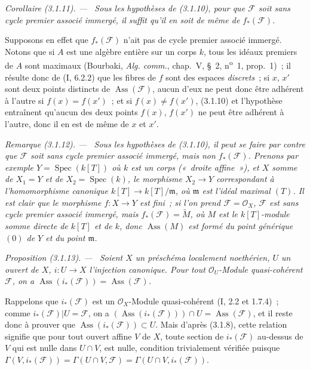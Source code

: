 \documentclass[10pt,oneside]{book}
\newenvironment{proposition}[1][]{%
  \par\medskip\noindent\itshape Proposition (#1). ---\ }{\par}
\newenvironment{corollary}[1][]{%
  \par\medskip\noindent\itshape Corollaire (#1). ---\ }{\par}
\newenvironment{remark}[1][]{%
  \par\medskip\noindent\itshape Remarque (#1). ---\ }{\par}
\begin{document}
\begin{corollary}[3.1.11]
\label{IV.2.3.1.11-fr}
Sous les hypothèses de (3.1.10), pour que $\mathcal F$ soit sans cycle premier
associé immergé, il suffit qu'il en soit de même de $f_*(\mathcal F)$.
\end{corollary}

Supposons en effet que $f_*(\mathcal F)$ n'ait pas de cycle premier associé
immergé. Notons que si $A$ est une algèbre entière sur un corps $k$, tous les
idéaux premiers de $A$ sont maximaux (Bourbaki, \emph{Alg. comm.}, chap.~V,
\S~2, n\textsuperscript{o}~1, prop.~1)~; il résulte donc de (I, 6.2.2) que les
fibres de $f$ sont des espaces \emph{discrets}~; si $x$, $x'$ sont deux points
distincts de $\operatorname{Ass}(\mathcal F)$, aucun d'eux ne peut donc être
adhérent à l'autre si $f(x)=f(x')$~; et si $f(x)\ne f(x')$, (3.1.10) et
l'hypothèse entraînent qu'aucun des deux points $f(x)$, $f(x')$ ne peut être
adhérent à l'autre, donc il en est de même de $x$ et $x'$.

\begin{remark}[3.1.12]
\label{IV.2.3.1.12-fr}
Sous les hypothèses de (3.1.10), il peut se faire par contre que $\mathcal F$
soit sans cycle premier associé immergé, mais non $f_*(\mathcal F)$. Prenons
par exemple $Y=\operatorname{Spec}(k[T])$ où $k$ est un corps («~droite
affine~»), et $X$ somme de $X_1=Y$ et de $X_2=\operatorname{Spec}(k)$, le
morphisme $X_2\to Y$ correspondant à l'homomorphisme canonique
$k[T]\to k[T]/\mathfrak m$, où $\mathfrak m$ est l'idéal maximal $(T)$. Il
est clair que le morphisme $f:X\to Y$ est fini~; si l'on prend
$\mathcal F=\mathcal O_X$, $\mathcal F$ est sans cycle premier associé
immergé, mais $f_*(\mathcal F)=\widetilde M$, où $M$ est le $k[T]$-module
somme directe de $k[T]$ et de $k$, donc $\operatorname{Ass}(M)$ est formé du
point générique $(0)$ de $Y$ et du point $\mathfrak m$.
\end{remark}

\begin{proposition}[3.1.13]
\label{IV.2.3.1.13-fr}
Soient $X$ un préschéma localement noethérien, $U$ un ouvert de $X$,
$i:U\to X$ l'injection canonique. Pour tout $\mathcal O_U$-Module
quasi-cohérent $\mathcal F$, on a
$\operatorname{Ass}(i_*(\mathcal F))=\operatorname{Ass}(\mathcal F)$.
\end{proposition}

Rappelons que $i_*(\mathcal F)$ est un $\mathcal O_X$-Module quasi-cohérent
(I, 2.2 et 1.7.4)~; comme $i_*(\mathcal F)|U=\mathcal F$, on a
$(\operatorname{Ass}(i_*(\mathcal F)))\cap U=\operatorname{Ass}(\mathcal F)$,
et il reste donc à prouver que $\operatorname{Ass}(i_*(\mathcal F))\subset U$.
Mais d'après (3.1.8), cette relation signifie que pour tout ouvert affine $V$
de $X$, toute section de $i_*(\mathcal F)$ au-dessus de $V$ qui est nulle
dans $U\cap V$, est nulle, condition trivialement vérifiée puisque
$\Gamma(V,i_*(\mathcal F))=\Gamma(U\cap V,\mathcal F)
=\Gamma(U\cap V,i_*(\mathcal F))$.
\end{document}
